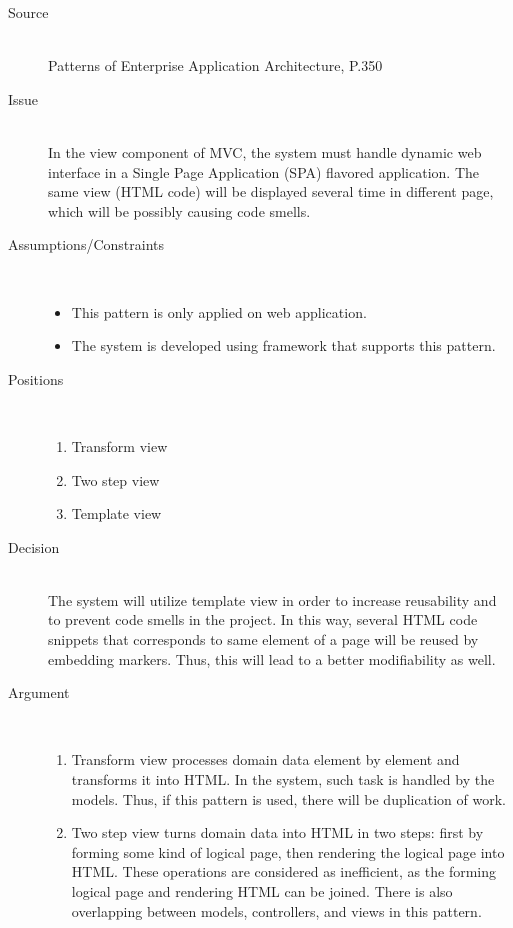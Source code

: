 \begin{description}
\item [Source]~\\
Patterns of Enterprise Application Architecture, P.350 \cite{Fowler:2002:PEA:579257}

\item [Issue]~\\
In the view component of MVC, the system must handle dynamic web interface in a Single Page Application (SPA) flavored application. The same view (HTML code) will be displayed several time in different page, which will be possibly causing code smells.

\item [Assumptions/Constraints]~
\begin{itemize}
\item This pattern is only applied on web application.
\item The system is developed using framework that supports this pattern.
\end{itemize}


\item [Positions]~
\begin{enumerate}
\item Transform view
\item Two step view
\item Template view
\end{enumerate}


\item [Decision] ~\\
The system will utilize template view in order to increase reusability and to prevent code smells in the project. In this way, several HTML code snippets that corresponds to same element of a page will be reused by embedding markers. Thus, this will lead to a better modifiability as well.

\item [Argument]~
\begin{enumerate}
\item Transform view processes domain data element by element and transforms it into HTML. In the system, such task is handled by the models. Thus, if this pattern is used, there will be duplication of work.

\item Two step view turns domain data into HTML in two steps: first by forming some kind of logical page, then rendering the logical page into HTML. These operations are considered as inefficient, as the forming logical page and rendering HTML can be joined. There is also overlapping between models, controllers, and views in this pattern.


\end{enumerate}
\end{description}
